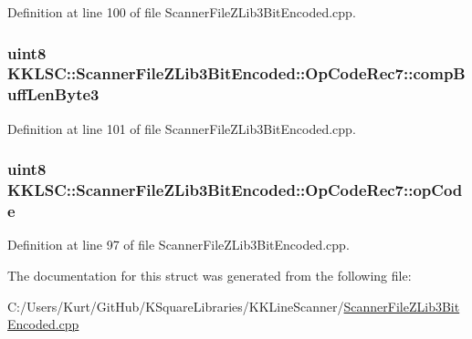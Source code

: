 Definition at line 100 of file Scanner\+File\+Z\+Lib3\+Bit\+Encoded.\+cpp.

\subsubsection[{\texorpdfstring{comp\+Buff\+Len\+Byte3}{compBuffLenByte3}}]{\setlength{\rightskip}{0pt plus 5cm}uint8 K\+K\+L\+S\+C\+::\+Scanner\+File\+Z\+Lib3\+Bit\+Encoded\+::\+Op\+Code\+Rec7\+::comp\+Buff\+Len\+Byte3}\hypertarget{struct_scanner_file_z_lib3_bit_encoded_1_1_op_code_rec7_a4824fd7bd3a1c186bb68d8b43fc8dbd2}{}\label{struct_scanner_file_z_lib3_bit_encoded_1_1_op_code_rec7_a4824fd7bd3a1c186bb68d8b43fc8dbd2}


Definition at line 101 of file Scanner\+File\+Z\+Lib3\+Bit\+Encoded.\+cpp.

\subsubsection[{\texorpdfstring{op\+Code}{opCode}}]{\setlength{\rightskip}{0pt plus 5cm}uint8 K\+K\+L\+S\+C\+::\+Scanner\+File\+Z\+Lib3\+Bit\+Encoded\+::\+Op\+Code\+Rec7\+::op\+Code}\hypertarget{struct_scanner_file_z_lib3_bit_encoded_1_1_op_code_rec7_a4ae58affe48ce67b0e84549497955646}{}\label{struct_scanner_file_z_lib3_bit_encoded_1_1_op_code_rec7_a4ae58affe48ce67b0e84549497955646}


Definition at line 97 of file Scanner\+File\+Z\+Lib3\+Bit\+Encoded.\+cpp.



The documentation for this struct was generated from the following file\+:\begin{DoxyCompactItemize}
\item 
C\+:/\+Users/\+Kurt/\+Git\+Hub/\+K\+Square\+Libraries/\+K\+K\+Line\+Scanner/\hyperlink{_scanner_file_z_lib3_bit_encoded_8cpp}{Scanner\+File\+Z\+Lib3\+Bit\+Encoded.\+cpp}\end{DoxyCompactItemize}
